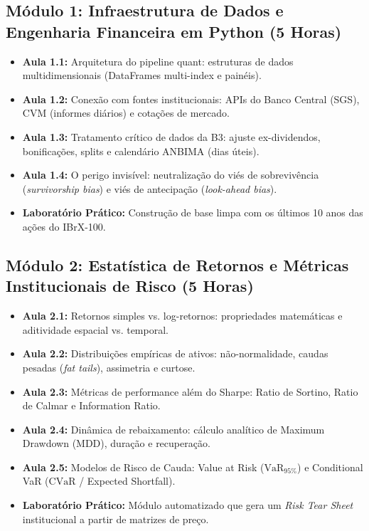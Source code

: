 \documentclass[11pt,a4paper]{article}
\begin{document}
\subsection*{Módulo 1: Infraestrutura de Dados e Engenharia Financeira em Python (5 Horas)}
\begin{itemize}[leftmargin=1.5em]
    \item \textbf{Aula 1.1:} Arquitetura do pipeline quant: estruturas de dados multidimensionais (DataFrames multi-index e painéis).
    \item \textbf{Aula 1.2:} Conexão com fontes institucionais: APIs do Banco Central (SGS), CVM (informes diários) e cotações de mercado.
    \item \textbf{Aula 1.3:} Tratamento crítico de dados da B3: ajuste ex-dividendos, bonificações, splits e calendário ANBIMA (dias úteis).
    \item \textbf{Aula 1.4:} O perigo invisível: neutralização do viés de sobrevivência (\textit{survivorship bias}) e viés de antecipação (\textit{look-ahead bias}).
    \item \textbf{Laboratório Prático:} Construção de base limpa com os últimos 10 anos das ações do IBrX-100.
\end{itemize}

\subsection*{Módulo 2: Estatística de Retornos e Métricas Institucionais de Risco (5 Horas)}
\begin{itemize}[leftmargin=1.5em]
    \item \textbf{Aula 2.1:} Retornos simples vs. log-retornos: propriedades matemáticas e aditividade espacial vs. temporal.
    \item \textbf{Aula 2.2:} Distribuições empíricas de ativos: não-normalidade, caudas pesadas (\textit{fat tails}), assimetria e curtose.
    \item \textbf{Aula 2.3:} Métricas de performance além do Sharpe: Ratio de Sortino, Ratio de Calmar e Information Ratio.
    \item \textbf{Aula 2.4:} Dinâmica de rebaixamento: cálculo analítico de Maximum Drawdown (MDD), duração e recuperação.
    \item \textbf{Aula 2.5:} Modelos de Risco de Cauda: Value at Risk ($\text{VaR}_{95\%}$) e Conditional VaR ($\text{CVaR}$ / Expected Shortfall).
    \item \textbf{Laboratório Prático:} Módulo automatizado que gera um \textit{Risk Tear Sheet} institucional a partir de matrizes de preço.
\end{itemize}
\end{document}
